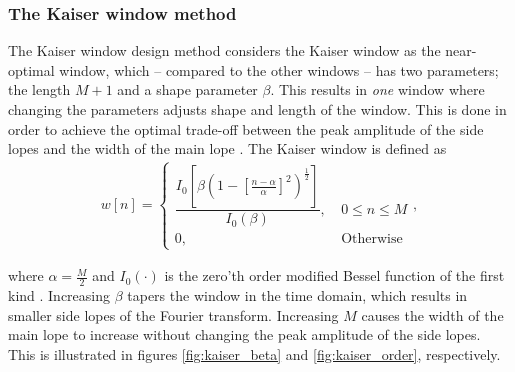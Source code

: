 \subsubsection{The Kaiser window method}
The Kaiser window design method considers the Kaiser window as the near-optimal window, which -- compared to the other windows -- has two parameters; the length $M+1$ and a shape parameter $\beta$. This results in \textit{one} window where changing the parameters adjusts shape and length of the window. This is done in order to achieve the optimal trade-off between the peak amplitude of the side lopes and the width of the main lope \cite{page 566, DTSP}. The Kaiser window is defined as
\begin{align*}
w[n] =
\begin{cases}
\dfrac{I_0[\beta (1-[\frac{n-\alpha}{\alpha}]^2)^{\frac{1}{2}}]}{I_0(\beta)} , &\ 0 \leq n \leq M  \\ 
0, &\ \text{Otherwise}
\end{cases},
\end{align*}

where $\alpha=\frac{M}{2}$ and $I_0(\cdot)$ is the zero'th order modified Bessel function of the first kind \cite{page 566, DTSP}. Increasing $\beta$ tapers the window in the time domain, which results in smaller side lopes of the Fourier transform. Increasing $M$ causes the width of the main lope to increase without changing the peak amplitude of the side lopes. This is illustrated in figures \ref{fig:kaiser_beta} and \ref{fig:kaiser_order}, respectively.

